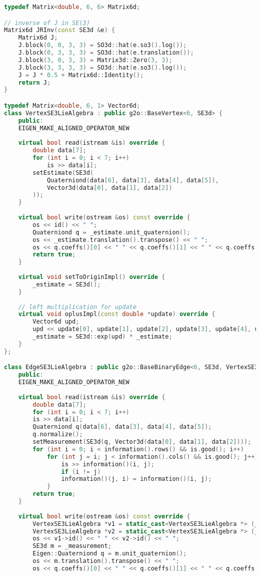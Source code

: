 \begin{lstlisting}[language=c++,caption=slambook2/ch10/pose\_graph\_g2o\_lie\_algebra.cpp (part)]
typedef Matrix<double, 6, 6> Matrix6d;

// inverse of J in SE(3)
Matrix6d JRInv(const SE3d &e) {
	Matrix6d J;
	J.block(0, 0, 3, 3) = SO3d::hat(e.so3().log());
	J.block(0, 3, 3, 3) = SO3d::hat(e.translation());
	J.block(3, 0, 3, 3) = Matrix3d::Zero(3, 3);
	J.block(3, 3, 3, 3) = SO3d::hat(e.so3().log());
	J = J * 0.5 + Matrix6d::Identity();
	return J;
}

typedef Matrix<double, 6, 1> Vector6d;
class VertexSE3LieAlgebra : public g2o::BaseVertex<6, SE3d> {
	public:
	EIGEN_MAKE_ALIGNED_OPERATOR_NEW
	
	virtual bool read(istream &is) override {
		double data[7];
		for (int i = 0; i < 7; i++)
			is >> data[i];
		setEstimate(SE3d(
			Quaterniond(data[6], data[3], data[4], data[5]),
			Vector3d(data[0], data[1], data[2])
		));
	}
	
	virtual bool write(ostream &os) const override {
		os << id() << " ";
		Quaterniond q = _estimate.unit_quaternion();
		os << _estimate.translation().transpose() << " ";
		os << q.coeffs()[0] << " " << q.coeffs()[1] << " " << q.coeffs()[2] << " " << q.coeffs()[3] << endl;
		return true;
	}
	
	virtual void setToOriginImpl() override {
		_estimate = SE3d();
	}
	
	// left multiplication for update
	virtual void oplusImpl(const double *update) override {
		Vector6d upd;
		upd << update[0], update[1], update[2], update[3], update[4], update[5];
		_estimate = SE3d::exp(upd) * _estimate;
	}
};

class EdgeSE3LieAlgebra : public g2o::BaseBinaryEdge<6, SE3d, VertexSE3LieAlgebra, VertexSE3LieAlgebra> {
	public:
	EIGEN_MAKE_ALIGNED_OPERATOR_NEW
	
	virtual bool read(istream &is) override {
		double data[7];
		for (int i = 0; i < 7; i++)
		is >> data[i];
		Quaterniond q(data[6], data[3], data[4], data[5]);
		q.normalize();
		setMeasurement(SE3d(q, Vector3d(data[0], data[1], data[2])));
		for (int i = 0; i < information().rows() && is.good(); i++)
			for (int j = i; j < information().cols() && is.good(); j++) {
				is >> information()(i, j);
				if (i != j)
				information()(j, i) = information()(i, j);
			}
		return true;
	}
	
	virtual bool write(ostream &os) const override {
		VertexSE3LieAlgebra *v1 = static_cast<VertexSE3LieAlgebra *> (_vertices[0]);
		VertexSE3LieAlgebra *v2 = static_cast<VertexSE3LieAlgebra *> (_vertices[1]);
		os << v1->id() << " " << v2->id() << " ";
		SE3d m = _measurement;
		Eigen::Quaterniond q = m.unit_quaternion();
		os << m.translation().transpose() << " ";
		os << q.coeffs()[0] << " " << q.coeffs()[1] << " " << q.coeffs()[2] << " " << q.coeffs()[3] << " ";
		

\end{lstlisting}
